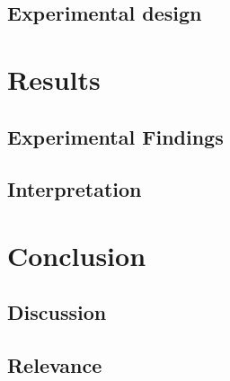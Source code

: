 \documentclass{article}
\begin{document}
\subsection{Experimental design}

\section{Results}
\subsection{Experimental Findings}
\subsection{Interpretation}

\section{Conclusion}
\subsection{Discussion}
\subsection{Relevance}



\end{document}
